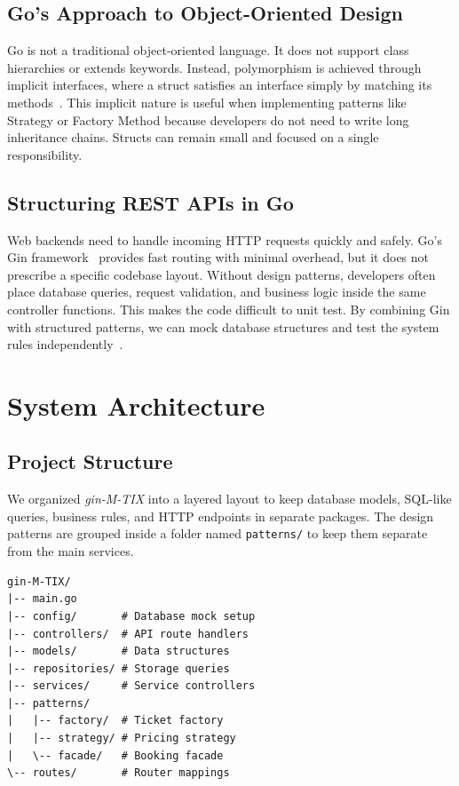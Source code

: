 \documentclass[conference]{IEEEtran}
\begin{document}
\subsection{Go's Approach to Object-Oriented Design}

Go is not a traditional object-oriented language. It does not support class hierarchies or extends keywords. Instead, polymorphism is achieved through implicit interfaces, where a struct satisfies an interface simply by matching its methods~\cite{ozkaya2021despat}. This implicit nature is useful when implementing patterns like Strategy or Factory Method because developers do not need to write long inheritance chains. Structs can remain small and focused on a single responsibility.

\subsection{Structuring REST APIs in Go}

Web backends need to handle incoming HTTP requests quickly and safely. Go's Gin framework~\cite{gin2024} provides fast routing with minimal overhead, but it does not prescribe a specific codebase layout. Without design patterns, developers often place database queries, request validation, and business logic inside the same controller functions. This makes the code difficult to unit test. By combining Gin with structured patterns, we can mock database structures and test the system rules independently~\cite{golmohammadi2022testing}.

\section{System Architecture}
\label{sec:system}

\subsection{Project Structure}

We organized \textit{gin-M-TIX} into a layered layout to keep database models, SQL-like queries, business rules, and HTTP endpoints in separate packages. The design patterns are grouped inside a folder named \texttt{patterns/} to keep them separate from the main services.

{\footnotesize
\begin{verbatim}
gin-M-TIX/
|-- main.go
|-- config/       # Database mock setup
|-- controllers/  # API route handlers
|-- models/       # Data structures
|-- repositories/ # Storage queries
|-- services/     # Service controllers
|-- patterns/
|   |-- factory/  # Ticket factory
|   |-- strategy/ # Pricing strategy
|   \-- facade/   # Booking facade
\-- routes/       # Router mappings
\end{verbatim}
}
\end{document}
